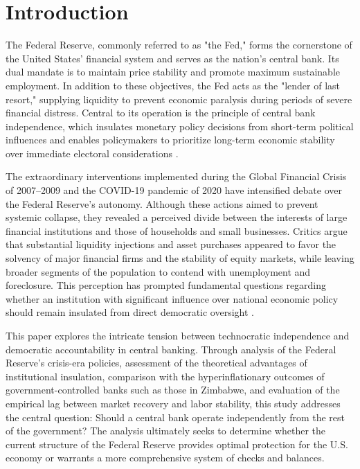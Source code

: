 \documentclass[12pt]{article}
\begin{document}
\newpage
\tableofcontents
\newpage

\section{Introduction}
{} The Federal Reserve, commonly referred to as "the Fed," forms the cornerstone of the United States' financial system and serves as the nation's central bank. Its dual mandate is to maintain price stability and promote maximum sustainable employment. In addition to these objectives, the Fed acts as the "lender of last resort," supplying liquidity to prevent economic paralysis during periods of severe financial distress. Central to its operation is the principle of central bank independence, which insulates monetary policy decisions from short-term political influences and enables policymakers to prioritize long-term economic stability over immediate electoral considerations \parencite{Richardson_2025, Athanasopoulos_2025}.

{} The extraordinary interventions implemented during the Global Financial Crisis of 2007--2009 and the COVID-19 pandemic of 2020 have intensified debate over the Federal Reserve's autonomy. Although these actions aimed to prevent systemic collapse, they revealed a perceived divide between the interests of large financial institutions and those of households and small businesses. Critics argue that substantial liquidity injections and asset purchases appeared to favor the solvency of major financial firms and the stability of equity markets, while leaving broader segments of the population to contend with unemployment and foreclosure. This perception has prompted fundamental questions regarding whether an institution with significant influence over national economic policy should remain insulated from direct democratic oversight \parencite{Buchanan_2016}.

{} This paper explores the intricate tension between technocratic independence and democratic accountability in central banking. Through analysis of the Federal Reserve's crisis-era policies, assessment of the theoretical advantages of institutional insulation, comparison with the hyperinflationary outcomes of government-controlled banks such as those in Zimbabwe, and evaluation of the empirical lag between market recovery and labor stability, this study addresses the central question: Should a central bank operate independently from the rest of the government? The analysis ultimately seeks to determine whether the current structure of the Federal Reserve provides optimal protection for the U.S. economy or warrants a more comprehensive system of checks and balances.
\end{document}
